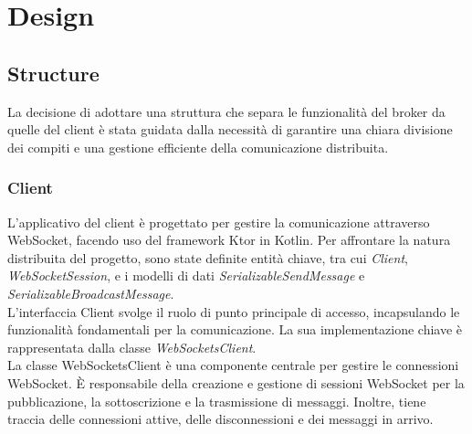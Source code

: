 \section{Design}




\subsection{Structure}

La decisione di adottare una struttura che separa le funzionalità del broker da quelle del client è stata
guidata dalla necessità di garantire una chiara divisione dei compiti e una gestione efficiente della comunicazione distribuita.

\subsubsection{Client}

L'applicativo del client è progettato per gestire la comunicazione attraverso WebSocket,
facendo uso del framework Ktor in Kotlin. Per affrontare la natura distribuita del progetto,
sono state definite entità chiave, tra cui \textit{Client}, \textit{WebSocketSession}, e i modelli di dati
\textit{SerializableSendMessage} e \textit{SerializableBroadcastMessage}. \\

L'interfaccia Client svolge il ruolo di punto principale di accesso, incapsulando le funzionalità fondamentali per la
comunicazione. La sua implementazione chiave è rappresentata dalla classe \textit{WebSocketsClient}.\\

La classe WebSocketsClient è una componente centrale per gestire le connessioni WebSocket.
È responsabile della creazione e gestione di sessioni WebSocket per la pubblicazione,
la sottoscrizione e la trasmissione di messaggi. Inoltre, tiene traccia delle connessioni attive, delle disconnessioni e dei messaggi in arrivo.\\

